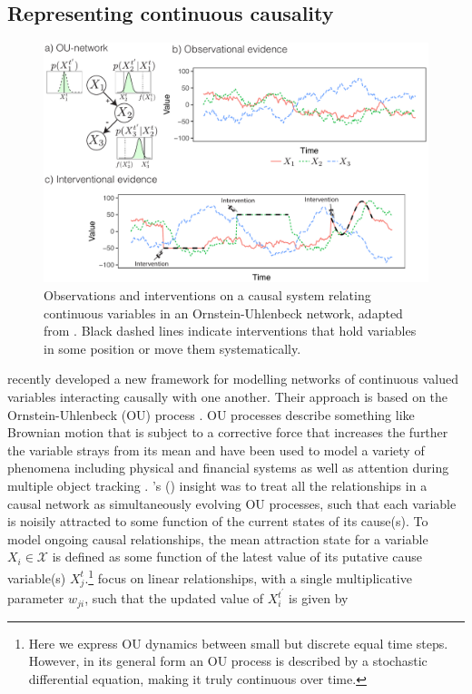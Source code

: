 \documentclass{cambridge7A}%
\def\citeapos#1{\citeauthor{#1}'s (\citeyear{#1})}
\begin{document}
\subsection{Representing continuous causality}

\begin{figure}[t]
   \centering
   \includegraphics[width = \columnwidth]{OU}
   \caption{Observations and interventions on a causal system relating continuous variables in an Ornstein-Uhlenbeck network, adapted from \cite{davis2018ctcv}.    Black dashed lines indicate interventions that hold variables in some position or move them systematically.}
   \label{fig:OU}
\end{figure}

\cite{davis2018ctcv} recently developed a new framework for modelling networks of continuous valued variables interacting causally with one another.  Their approach is based on the Ornstein-Uhlenbeck (OU) process \citep{uhlenbeck1930theory}.  
OU processes describe something like Brownian motion that is subject to a corrective force that increases the further the variable strays from its mean and  
have been used to model a variety of phenomena including physical \citep{lacko2012planning} and financial \citep{barndorff2001non} systems as well as attention during multiple object tracking \citep{vul2009explaining}.  \citeapos{davis2018ctcv} insight was to treat all the relationships in a causal network as simultaneously evolving OU processes, such that each variable is noisily attracted to some function of the current states of its cause(s).    
To model ongoing causal relationships, the mean attraction state for a variable $X_i\in\mathcal{X}$ is defined as some function of the latest value of its putative cause variable(s) $X^t_j$.\footnote{Here we express OU dynamics between small but discrete equal time steps.  However, in its general form an OU process is described by a stochastic differential equation, making it truly continuous over time.}  \cite{davis2018ctcv} focus on linear relationships, with a single multiplicative parameter $w_{ji}$, such that the updated value of $X_i^{t^{\prime}}$ is given by
\end{document}

